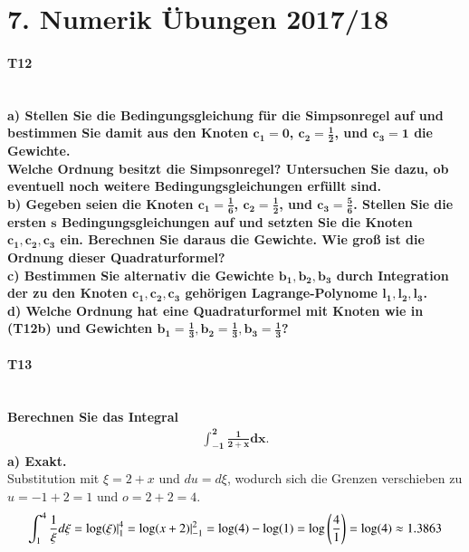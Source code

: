 \documentclass[10pt,a4paper]{article}
\begin{document}
	\section*{7. Numerik Übungen 2017/18}
	\paragraph{T12}\mbox{}\\
	\textbf{%
		a) Stellen Sie die Bedingungsgleichung für die Simpsonregel auf und bestimmen Sie damit aus den Knoten $\pmb{c_1=0}$, $\pmb{c_2=\frac{1}{2}}$, und $\pmb{c_3=1}$ die Gewichte.\\
        Welche Ordnung besitzt die Simpsonregel? Untersuchen Sie dazu, ob eventuell noch weitere Bedingungsgleichungen erfüllt sind.
	}\\
	
    
    
    \textbf{%
        b) Gegeben seien die Knoten $\pmb{c_1=\frac{1}{6}}$, $\pmb{c_2=\frac{1}{2}}$, und $\pmb{c_3=\frac{5}{6}}$. Stellen Sie die ersten $\pmb{s}$ Bedingungsgleichungen auf und setzten Sie die Knoten $\pmb{c_1, c_2, c_3}$ ein. Berechnen Sie daraus die Gewichte. Wie groß ist die Ordnung dieser Quadraturformel?
    }\\


    \textbf{%
        c) Bestimmen Sie alternativ die Gewichte $\pmb{b_1, b_2, b_3}$ durch Integration der zu den Knoten $\pmb{c_1, c_2, c_3}$ gehörigen Lagrange-Polynome $\pmb{l_1, l_2, l_3}$.
    }\\


    \textbf{%
        d) Welche Ordnung hat eine Quadraturformel mit Knoten wie in (T12b) und Gewichten $\pmb{b_1=\frac{1}{3}, b_2=\frac{1}{3}, b_3=\frac{1}{3}}$?
    }\\



    \pagebreak
    \paragraph{T13}\mbox{}\\
    \textbf{%
        Berechnen Sie das Integral
        \begin{align*}
            \pmb{\int_{-1}^{2}\frac{1}{2+x}dx}.
        \end{align*}
        a) Exakt.}\\
        Substitution mit $\xi=2+x$ und $du=d\xi$, wodurch sich die Grenzen verschieben zu $u=-1+2=1$ und $o=2+2=4$.
        \begin{align*}
            \int_{1}^{4}\frac{1}{\xi}d\xi = \text{log}(\xi)\arrowvert^4_1 = \text{log}(x+2)\arrowvert^2_{-1} = \text{log}(4)-\text{log}(1) = \text{log}\left(\frac{4}{1}\right)=\text{log}(4)\approx1.3863
        \end{align*}
        
\end{document}

